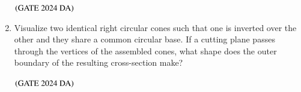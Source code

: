 \documentclass[journal,12pt,onecolumn]{IEEEtran}
\theoremstyle{remark}
\begin{document}
\begin{enumerate}
\begin{enumerate}
\end{enumerate}
\hfill $\left(\text{GATE 2024 DA}\right)$

\item Visualize two identical right circular cones such that one is inverted over the other and they share a common circular base. If a cutting plane passes through the vertices of the assembled cones, what shape does the outer boundary of the resulting cross-section make?
\begin{enumerate}
\end{enumerate}
\hfill $\left(\text{GATE 2024 DA}\right)$
\end{enumerate}

\hrulefill
\end{document}
